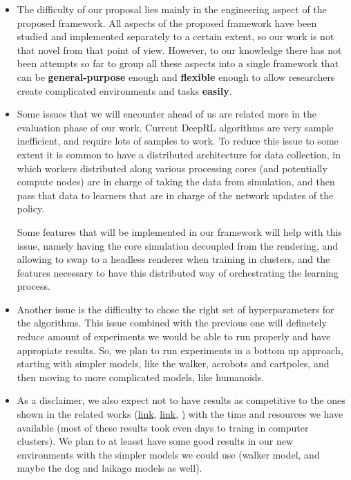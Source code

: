 \begin{itemize}
    \item The difficulty of our proposal lies mainly in the engineering aspect
          of the proposed framework. All aspects of the proposed framework have
          been studied and implemented separately to a certain extent, so our work 
          is not that novel from that point of view. However, to our knowledge there
          has not been attempts so far to group all these aspects into a single
          framework that can be \textbf{general-purpose} enough and \textbf{flexible} 
          enough to allow researchers create complicated environments and tasks
          \textbf{easily}.

    \item Some issues that we will encounter ahead of us are related more in the
          evaluation phase of our work. Current DeepRL algorithms are very sample
          inefficient, and require lots of samples to work. To reduce this issue
          to some extent it is common to have a distributed architecture for data
          collection, in which workers distributed along various processing cores
          (and potentially compute nodes) are in charge of taking the data from
          simulation, and then pass that data to learners that are in charge
          of the network updates of the policy. 

          Some features that will be implemented in our framework will help with
          this issue, namely having the core simulation decoupled from the rendering,
          and allowing to swap to a headless renderer when training in clusters, and
          the features necessary to have this distributed way of orchestrating the
          learning process.

    \item Another issue is the difficulty to chose the right set of hyperparameters
          for the algorithms. This issue combined with the previous one will definetely
          reduce amount of experiments we would be able to run properly and have
          appropiate results. So, we plan to run experiments in a bottom up approach,
          starting with simpler models, like the walker, acrobots and cartpoles,
          and then moving to more complicated models, like humanoids.

    \item As a disclaimer, we also expect not to have results as competitive to
          the ones shown in the related works (\href{https://youtu.be/KPfzRSBzNX4}{link}, 
          \href{https://youtu.be/hx_bgoTF7bs}{link}, \href{https://youtu.be/hd1yvLWm6oA}) 
          with the time and resources we have available (most of these results took
          even days to traing in computer clusters). We plan to at leasst have
          some good results in our new environments with the simpler models we could
          use (walker model, and maybe the dog and laikago models as well).


\end{itemize}
